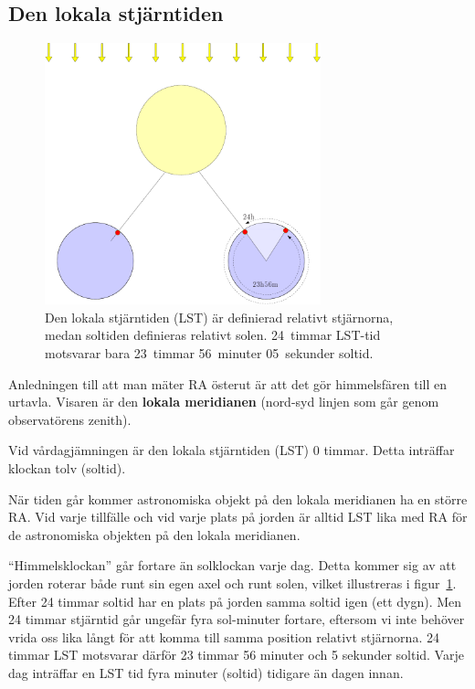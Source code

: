 \subsection{Den lokala stjärntiden}

\begin{figure}[ht]
\begin{center}
 \includegraphics[width=8cm]{../figures/lst.pdf}
\end{center}
\caption{Den lokala stjärntiden (LST) är definierad relativt
  stjärnorna, medan soltiden definieras relativt solen. 24~timmar
  LST-tid motsvarar bara 23~timmar 56~minuter 05~sekunder soltid.}
\label{figlst}
\end{figure}

Anledningen till att man mäter RA österut är att det gör himmelsfären
till en urtavla. Visaren är den \textbf{lokala meridianen} (nord-syd
linjen som går genom observatörens zenith).


Vid vårdagjämningen är den lokala stjärntiden (LST) 0 timmar. Detta
inträffar klockan tolv (soltid).

När tiden går kommer astronomiska objekt på den lokala meridianen ha
en större RA. Vid varje tillfälle och vid varje plats på jorden är
alltid LST lika med RA för de astronomiska objekten på den lokala meridianen.

``Himmelsklockan'' går fortare än solklockan varje dag. Detta kommer
sig av att jorden roterar både runt sin egen axel och runt solen,
vilket illustreras i figur~\ref{figlst}. Efter 24 timmar soltid har en
plats på jorden samma soltid igen (ett dygn). Men 24 timmar stjärntid
går ungefär fyra sol-minuter fortare, eftersom vi inte behöver vrida
oss lika långt för att komma till samma position relativt
stjärnorna. 24 timmar LST motsvarar därför 23 timmar 56 minuter och 5
sekunder soltid. Varje dag inträffar en LST tid fyra minuter (soltid)
tidigare än dagen innan.

